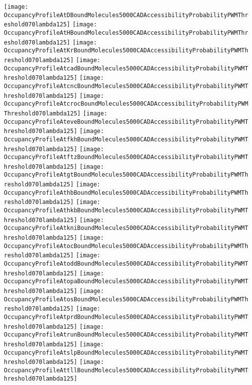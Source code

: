 \documentclass[11pt]{article}
\begin{document}
 


\begin{center}
\texttt{[image: OccupancyProfileAtDBoundMolecules5000CADAccessibilityProbabilityPWMThreshold070lambda125]}
\texttt{[image: OccupancyProfileAtHBoundMolecules5000CADAccessibilityProbabilityPWMThreshold070lambda125]}
\texttt{[image: OccupancyProfileAtKrBoundMolecules5000CADAccessibilityProbabilityPWMThreshold070lambda125]}
\texttt{[image: OccupancyProfileAtcadBoundMolecules5000CADAccessibilityProbabilityPWMThreshold070lambda125]}
\texttt{[image: OccupancyProfileAtcncBoundMolecules5000CADAccessibilityProbabilityPWMThreshold070lambda125]}
\texttt{[image: OccupancyProfileAtcrocBoundMolecules5000CADAccessibilityProbabilityPWMThreshold070lambda125]}
\texttt{[image: OccupancyProfileAteveBoundMolecules5000CADAccessibilityProbabilityPWMThreshold070lambda125]}
\texttt{[image: OccupancyProfileAtfkhBoundMolecules5000CADAccessibilityProbabilityPWMThreshold070lambda125]}
\texttt{[image: OccupancyProfileAtftzBoundMolecules5000CADAccessibilityProbabilityPWMThreshold070lambda125]}
\texttt{[image: OccupancyProfileAtgtBoundMolecules5000CADAccessibilityProbabilityPWMThreshold070lambda125]}
\texttt{[image: OccupancyProfileAthbBoundMolecules5000CADAccessibilityProbabilityPWMThreshold070lambda125]}
\texttt{[image: OccupancyProfileAthkbBoundMolecules5000CADAccessibilityProbabilityPWMThreshold070lambda125]}
\texttt{[image: OccupancyProfileAtkniBoundMolecules5000CADAccessibilityProbabilityPWMThreshold070lambda125]}
\texttt{[image: OccupancyProfileAtocBoundMolecules5000CADAccessibilityProbabilityPWMThreshold070lambda125]}
\texttt{[image: OccupancyProfileAtoddBoundMolecules5000CADAccessibilityProbabilityPWMThreshold070lambda125]}
\texttt{[image: OccupancyProfileAtopaBoundMolecules5000CADAccessibilityProbabilityPWMThreshold070lambda125]}
\texttt{[image: OccupancyProfileAtosBoundMolecules5000CADAccessibilityProbabilityPWMThreshold070lambda125]}
\texttt{[image: OccupancyProfileAtprdBoundMolecules5000CADAccessibilityProbabilityPWMThreshold070lambda125]}
\texttt{[image: OccupancyProfileAtrunBoundMolecules5000CADAccessibilityProbabilityPWMThreshold070lambda125]}
\texttt{[image: OccupancyProfileAtslpBoundMolecules5000CADAccessibilityProbabilityPWMThreshold070lambda125]}
\texttt{[image: OccupancyProfileAttllBoundMolecules5000CADAccessibilityProbabilityPWMThreshold070lambda125]}
\end{center}






\end{document}
